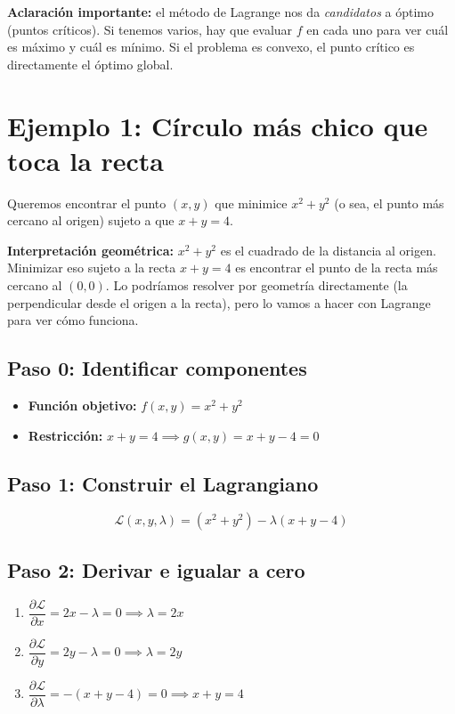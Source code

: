 \documentclass[12pt]{article}
\begin{document}
\vspace{0.5em}

\textbf{Aclaración importante:} el método de Lagrange nos da \textit{candidatos} a óptimo (puntos críticos). Si tenemos varios, hay que evaluar $f$ en cada uno para ver cuál es máximo y cuál es mínimo. Si el problema es convexo, el punto crítico es directamente el óptimo global.

\section{Ejemplo 1: Círculo más chico que toca la recta}

Queremos encontrar el punto $(x, y)$ que minimice $x^2 + y^2$ (o sea, el punto más cercano al origen) sujeto a que $x + y = 4$.

\vspace{0.5em}

\textbf{Interpretación geométrica:} $x^2 + y^2$ es el cuadrado de la distancia al origen. Minimizar eso sujeto a la recta $x + y = 4$ es encontrar el punto de la recta más cercano al $(0,0)$. Lo podríamos resolver por geometría directamente (la perpendicular desde el origen a la recta), pero lo vamos a hacer con Lagrange para ver cómo funciona.

\subsection{Paso 0: Identificar componentes}

\begin{itemize}
    \item \textbf{Función objetivo:} $f(x, y) = x^2 + y^2$
    \item \textbf{Restricción:} $x + y = 4 \implies g(x, y) = x + y - 4 = 0$
\end{itemize}

\subsection{Paso 1: Construir el Lagrangiano}

\[
\mathcal{L}(x, y, \lambda) = (x^2 + y^2) - \lambda(x + y - 4)
\]

\subsection{Paso 2: Derivar e igualar a cero}

\begin{enumerate}
    \item $\dfrac{\partial \mathcal{L}}{\partial x} = 2x - \lambda = 0 \implies \lambda = 2x$
    \item $\dfrac{\partial \mathcal{L}}{\partial y} = 2y - \lambda = 0 \implies \lambda = 2y$
    \item $\dfrac{\partial \mathcal{L}}{\partial \lambda} = -(x + y - 4) = 0 \implies x + y = 4$
\end{enumerate}
\end{document}
